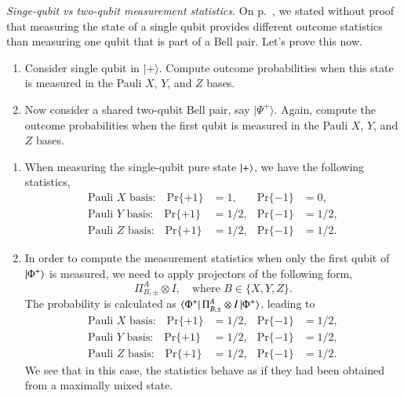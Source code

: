 \begin{exercise}
\emph{Singe-qubit vs two-qubit measurement statistics.} On p.~\pageref{page:plus-is-pure}, we stated without proof that measuring the state of a single qubit provides different outcome statistics than measuring one qubit that is part of a Bell pair. Let's prove this now. 
\begin{enumerate}[label=(\alph*)]
    \item Consider single qubit in $|+\rangle$. Compute outcome probabilities when this state is measured in the Pauli $X$, $Y$, and $Z$ bases.
    \item Now consider a shared two-qubit Bell pair, say $|\Psi^+\rangle$. Again, compute the outcome probabilities when the first qubit is measured in the Pauli $X$, $Y$, and $Z$ bases.
\end{enumerate}
\end{exercise}
\begin{solution}
\begin{enumerate}[label=(\alph*)]
    \item When measuring the single-qubit pure state $\left| + \right\rangle$, we have the following statistics,
    \begin{align*}
        \text{Pauli }X\text{ basis:} \quad \text{Pr}\{+1\} & = 1, & \text{Pr}\{-1\} & = 0, \\
        \text{Pauli }Y\text{ basis:} \quad \text{Pr}\{+1\} & = 1/2, & \text{Pr}\{-1\} & = 1/2, \\
        \text{Pauli }Z\text{ basis:} \quad \text{Pr}\{+1\} & = 1/2, & \text{Pr}\{-1\} & = 1/2.
    \end{align*}
    \item In order to compute the measurement statistics when only the first qubit of $\left| \Phi^+ \right\rangle$ is measured, we need to apply projectors of the following form,
    \begin{equation*}
        \Pi^A_{B,\pm} \otimes I, \quad\text{where }B\in\{X,Y,Z\}.
    \end{equation*}
    The probability is calculated as $\left\langle \Phi^+ \right|\Pi^A_{B,\pm} \otimes I\left| \Phi^+ \right\rangle$, leading to
    \begin{align*}
        \text{Pauli }X\text{ basis:} \quad \text{Pr}\{+1\} & = 1/2, & \text{Pr}\{-1\} & = 1/2, \\
        \text{Pauli }Y\text{ basis:} \quad \text{Pr}\{+1\} & = 1/2, & \text{Pr}\{-1\} & = 1/2, \\
        \text{Pauli }Z\text{ basis:} \quad \text{Pr}\{+1\} & = 1/2, & \text{Pr}\{-1\} & = 1/2.
    \end{align*}
    We see that in this case, the statistics behave as if they had been obtained from a maximally mixed state.
\end{enumerate}
\end{solution}


